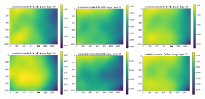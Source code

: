 \documentclass[letterpaper,11pt]{article}
\begin{document}
\begin{figure}[!ht]
\includegraphics[width=0.3\textwidth]{images/results/masked_over_unmasked_flatfield_image_layers_vectra/masked_over_unmasked_flatfield_image_layer_19}
\includegraphics[width=0.3\textwidth]{images/results/masked_over_unmasked_flatfield_image_layers_vectra/masked_over_unmasked_flatfield_image_layer_22}
\includegraphics[width=0.3\textwidth]{images/results/masked_over_unmasked_flatfield_image_layers_vectra/masked_over_unmasked_flatfield_image_layer_25}
\includegraphics[width=0.3\textwidth]{images/results/masked_over_unmasked_flatfield_image_layers_vectra/masked_over_unmasked_flatfield_image_layer_26}
\includegraphics[width=0.3\textwidth]{images/results/masked_over_unmasked_flatfield_image_layers_vectra/masked_over_unmasked_flatfield_image_layer_29}
\includegraphics[width=0.3\textwidth]{images/results/masked_over_unmasked_flatfield_image_layers_vectra/masked_over_unmasked_flatfield_image_layer_32}

\end{figure}
\end{document}
